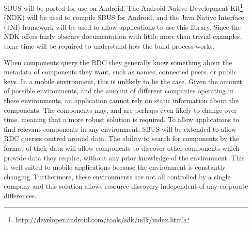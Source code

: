 \documentclass[12pt,twoside,notitlepage]{report}
\begin{document}
SBUS will be ported for use on Android. 
The Android Native Development Kit\footnote{\url{http://developer.android.com/tools/sdk/ndk/index.html}} (NDK) will be used to compile SBUS for Android, and the Java Native Interface (JNI) framework will be used to allow applications to use this library. 
Since the NDK offers fairly obscure documentation with little more than trivial examples, some time will be required to understand how the build process works. 

When components query the RDC they generally know something about the metadata of components they want, such as names, connected peers, or public keys. 
In a mobile environment, this is unlikely to be the case. 
Given the amount of possible environments, and the amount of different companies operating in these environments, an application cannot rely on static information about the components. 
The components may, and are perhaps even likely to change over time, meaning that a more robust solution is required. 
To allow applications to find relevant components in any environment, SBUS will be extended to allow RDC queries centred around data. 
The ability to search for components by the format of their data will allow components to discover other components which provide data they require, without any prior knowledge of the environment. 
This is well suited to mobile applications because the environment is constantly changing. 
Furthermore, these environments are not all controlled by a single company and this solution allows resource discovery independent of any corporate differences. 
\end{document}
